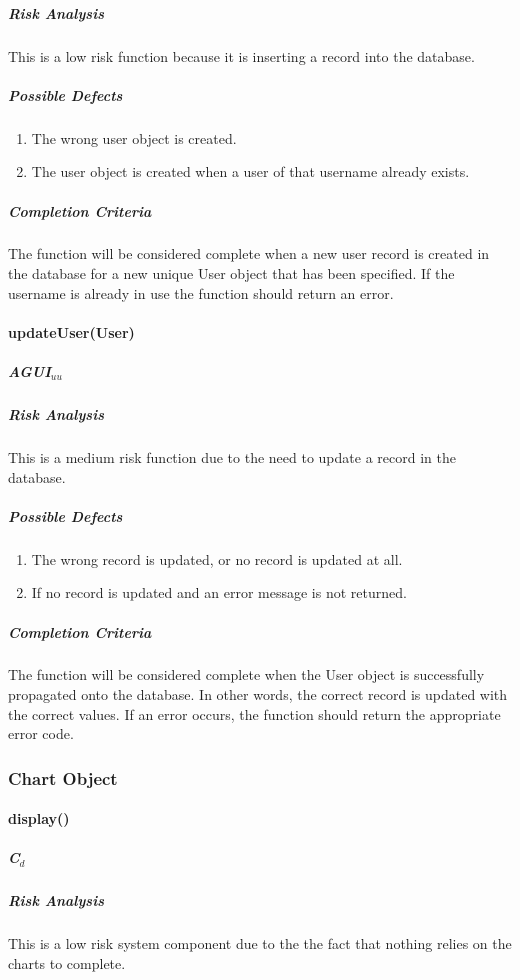 \documentclass{article}
\begin{document}
\subparagraph{Risk Analysis}
This is a low risk function because it is inserting a record into the database.

\subparagraph{Possible Defects}
\begin{enumerate}
\item The wrong user object is created.
\item The user object is created when a user of that username already exists.
\end{enumerate}

\subparagraph{Completion Criteria}
The function will be considered complete when a new user record is created in the database for a new unique User object that has been specified. If the username is already in use the function should return an error.


\paragraph{updateUser(User)}
\subparagraph{AGUI$_{uu}$}

\subparagraph{Risk Analysis}
This is a medium risk function due to the need to update a record in the database.

\subparagraph{Possible Defects}
\begin{enumerate}
\item The wrong record is updated, or no record is updated at all.
\item If no record is updated and an error message is not returned.
\end{enumerate}

\subparagraph{Completion Criteria}
The function will be considered complete when the User object is successfully propagated onto the database. In other words, the correct record is updated with the correct values. If an error occurs, the function should return the appropriate error code.


\subsubsection{Chart Object}

\paragraph{display()}

\subparagraph{C$_{d}$}

\subparagraph{Risk Analysis}
This is a low risk system component due to the the fact that nothing relies on the charts to complete.
\end{document}
